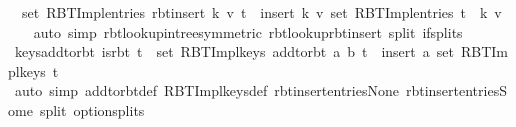 \begin{isabellebody}
\ \ set\ {\isacharparenleft}{\kern0pt}RBT{\isacharunderscore}{\kern0pt}Impl{\isachardot}{\kern0pt}entries\ {\isacharparenleft}{\kern0pt}rbt{\isacharunderscore}{\kern0pt}insert\ k\ v\ t{\isacharparenright}{\kern0pt}{\isacharparenright}{\kern0pt}\ {\isacharequal}{\kern0pt}\ insert\ {\isacharparenleft}{\kern0pt}k{\isacharcomma}{\kern0pt}\ v{\isacharparenright}{\kern0pt}\ {\isacharparenleft}{\kern0pt}set\ {\isacharparenleft}{\kern0pt}RBT{\isacharunderscore}{\kern0pt}Impl{\isachardot}{\kern0pt}entries\ t{\isacharparenright}{\kern0pt}\ {\isacharminus}{\kern0pt}\ {\isacharbraceleft}{\kern0pt}{\isacharparenleft}{\kern0pt}k{\isacharcomma}{\kern0pt}\ v{\isacharprime}{\kern0pt}{\isacharparenright}{\kern0pt}{\isacharbraceright}{\kern0pt}{\isacharparenright}{\kern0pt}{\isachardoublequoteclose}\isanewline
%
\isadelimproof
\ \ %
\endisadelimproof
%
\isatagproof
{}\isamarkupfalse%
\ {\isacharparenleft}{\kern0pt}auto\ simp{\isacharcolon}{\kern0pt}\ rbt{\isacharunderscore}{\kern0pt}lookup{\isacharunderscore}{\kern0pt}in{\isacharunderscore}{\kern0pt}tree{\isacharbrackleft}{\kern0pt}symmetric{\isacharbrackright}{\kern0pt}\ rbt{\isacharunderscore}{\kern0pt}lookup{\isacharunderscore}{\kern0pt}rbt{\isacharunderscore}{\kern0pt}insert\ split{\isacharcolon}{\kern0pt}\ if{\isacharunderscore}{\kern0pt}splits{\isacharparenright}{\kern0pt}%
\endisatagproof
{\isafoldproof}%
%
\isadelimproof
\isanewline
%
\endisadelimproof
\isanewline
{}\isamarkupfalse%
\ keys{\isacharunderscore}{\kern0pt}add{\isacharunderscore}{\kern0pt}to{\isacharunderscore}{\kern0pt}rbt{\isacharcolon}{\kern0pt}\ {\isachardoublequoteopen}is{\isacharunderscore}{\kern0pt}rbt\ t\ {\isasymLongrightarrow}\ set\ {\isacharparenleft}{\kern0pt}RBT{\isacharunderscore}{\kern0pt}Impl{\isachardot}{\kern0pt}keys\ {\isacharparenleft}{\kern0pt}add{\isacharunderscore}{\kern0pt}to{\isacharunderscore}{\kern0pt}rbt\ {\isacharparenleft}{\kern0pt}a{\isacharcomma}{\kern0pt}\ b{\isacharparenright}{\kern0pt}\ t{\isacharparenright}{\kern0pt}{\isacharparenright}{\kern0pt}\ {\isacharequal}{\kern0pt}\ insert\ a\ {\isacharparenleft}{\kern0pt}set\ {\isacharparenleft}{\kern0pt}RBT{\isacharunderscore}{\kern0pt}Impl{\isachardot}{\kern0pt}keys\ t{\isacharparenright}{\kern0pt}{\isacharparenright}{\kern0pt}{\isachardoublequoteclose}\isanewline
%
\isadelimproof
\ \ %
\endisadelimproof
%
\isatagproof
{}\isamarkupfalse%
\ {\isacharparenleft}{\kern0pt}auto\ simp{\isacharcolon}{\kern0pt}\ add{\isacharunderscore}{\kern0pt}to{\isacharunderscore}{\kern0pt}rbt{\isacharunderscore}{\kern0pt}def\ RBT{\isacharunderscore}{\kern0pt}Impl{\isachardot}{\kern0pt}keys{\isacharunderscore}{\kern0pt}def\ rbt{\isacharunderscore}{\kern0pt}insert{\isacharunderscore}{\kern0pt}entries{\isacharunderscore}{\kern0pt}None\ rbt{\isacharunderscore}{\kern0pt}insert{\isacharunderscore}{\kern0pt}entries{\isacharunderscore}{\kern0pt}Some\ split{\isacharcolon}{\kern0pt}\ option{\isachardot}{\kern0pt}splits{\isacharparenright}{\kern0pt}%

\end{isabellebody}
